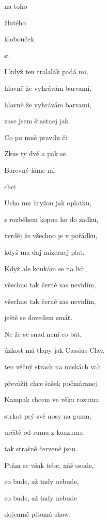 

\zs
{} na toho 

 žlutého 

 klobouček 

 si   
\ks

\zs
I když ten tralalák padá mi,

hlavně že vyhrávám barvami,

hlavně že vyhrávám barvami,

zase jsem šťastnej jak   
\ks

\zr
Co po mně  pravdu či 

Zkus ty dvě  a pak se 

Barevný  láme mi 

 chci  
\kr

\zs
Ucho mu hryžou jak oplatku,

s rozběhem kopou ho do zadku,

tvrděj že všechno je v pořádku,

když mu daj mizernej plat.
\ks

\zs
Když ale koukám se na lidi,

všechno tak černě zas nevidím,

všechno tak černě zas nevidím,

ještě se dovedem smát.
\ks

\zr
Ne že se snad není co bát,

úzkost má tlapy jak Cassius Clay,

ten věčný strach na miskách vah

převážit chce šašek počmáranej.
\kr

\zs
Kampak chcem ve věku rozumu

strkat prý své nosy na gumu,

určitě od rumu z konzumu

tak strašně červené jsou.
\ks

\zs
Ptám se však tebe, náš osude,

co bude, až tady nebude,

co bude, až tady nebude

dojemně pitomá show.
\ks

